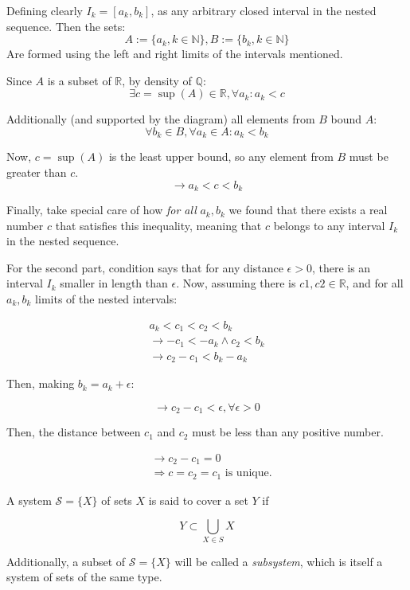 \begin{bookproof}
Defining clearly $I_k = [a_k, b_k]$, as any arbitrary closed interval in the nested sequence. Then the sets:
$$A := \{a_k, k \in \mathbb{N} \}, B := \{b_k, k \in \mathbb{N} \}$$
Are formed using the left and right limits of the intervals mentioned.



Since $A$ is a subset of $\mathbb{R}$, by density of $\mathbb{Q}$:
$$\exists c = \sup(A) \in \mathbb{R}, \forall a_k: a_k < c$$

Additionally (and supported by the diagram) all elements from $B$ bound $A$:
$$\forall b_k \in B, \forall a_k \in A: a_k < b_k$$

Now, $c = \sup(A)$ is the least upper bound, so any element from $B$ must be greater than $c$.
$$\rightarrow a_k < c < b_k$$

Finally, take special care of how \textit{for all} $a_k, b_k$ we found that there exists a real number $c$ that satisfies this inequality, meaning that $c$ belongs to any interval $I_k$ in the nested sequence.

For the second part, condition says that for any distance $\epsilon > 0$, there is an interval $I_k$ smaller in length than $\epsilon$. Now, assuming there is $c1, c2 \in \mathbb{R}$, and for all $a_k, b_k$ limits of the nested intervals:

\begin{align*}
a_k < c_1 < c_2 < b_k \\
\rightarrow -c_1 < -a_k \wedge c_2 < b_k \\
\rightarrow c_2 - c_1 < b_k - a_k
\end{align*}

Then, making $b_k = a_k + \epsilon$:

$$\rightarrow c_2 - c_1 < \epsilon, \forall \epsilon > 0$$

Then, the distance between $c_1$ and $c_2$ must be less than any positive number.

\begin{align*}
&\rightarrow c_2 - c_1 = 0 \\
&\Rightarrow c = c_2 = c_1 \text{ is unique.}
\end{align*}
\end{bookproof}

\begin{definition}
A system $\mathcal{S} = \{X\}$ of sets $X$ is said to cover a set $Y$ if

$$Y \subset \bigcup_{X \in S} X$$

Additionally, a subset of $\mathcal{S} = \{X\}$ will be called a \textit{subsystem}, which is itself a system of sets of the same type.
\end{definition}

